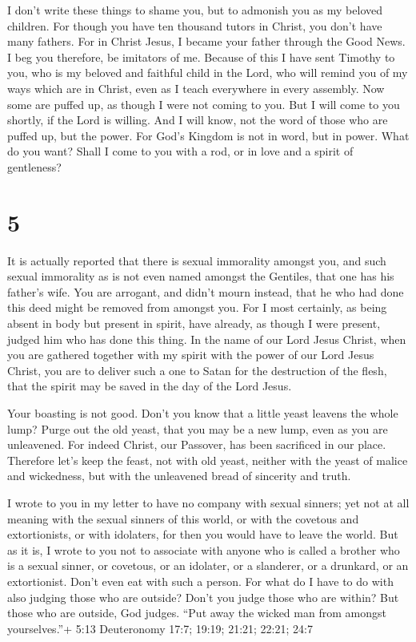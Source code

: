 I don't write these things to shame you, but to admonish
you as my beloved children.  For though you have ten
thousand tutors in Christ, you don't have many fathers. For in Christ
Jesus, I became your father through the Good News.  I beg
you therefore, be imitators of me.  Because of this I have
sent Timothy to you, who is my beloved and faithful child in the Lord,
who will remind you of my ways which are in Christ, even as I teach
everywhere in every assembly.  Now some are puffed up, as
though I were not coming to you.  But I will come to you
shortly, if the Lord is willing. And I will know, not the word of those
who are puffed up, but the power.  For God's Kingdom is not
in word, but in power.  What do you want? Shall I come to
you with a rod, or in love and a spirit of gentleness?

\hypertarget{section-4}{%
\section{5}\label{section-4}}

 It is actually reported that there is sexual immorality
amongst you, and such sexual immorality as is not even named amongst the
Gentiles, that one has his father's wife.  You are arrogant,
and didn't mourn instead, that he who had done this deed might be
removed from amongst you.  For I most certainly, as being
absent in body but present in spirit, have already, as though I were
present, judged him who has done this thing.  In the name of
our Lord Jesus Christ, when you are gathered together with my spirit
with the power of our Lord Jesus Christ,  you are to deliver
such a one to Satan for the destruction of the flesh, that the spirit
may be saved in the day of the Lord Jesus.

 Your boasting is not good. Don't you know that a little
yeast leavens the whole lump?  Purge out the old yeast, that
you may be a new lump, even as you are unleavened. For indeed Christ,
our Passover, has been sacrificed in our place.  Therefore
let's keep the feast, not with old yeast, neither with the yeast of
malice and wickedness, but with the unleavened bread of sincerity and
truth.

 I wrote to you in my letter to have no company with sexual
sinners;  yet not at all meaning with the sexual sinners of
this world, or with the covetous and extortionists, or with idolaters,
for then you would have to leave the world.  But as it is,
I wrote to you not to associate with anyone who is called a brother who
is a sexual sinner, or covetous, or an idolater, or a slanderer, or a
drunkard, or an extortionist. Don't even eat with such a person.
 For what do I have to do with also judging those who are
outside? Don't you judge those who are within?  But those
who are outside, God judges. ``Put away the wicked man from amongst
yourselves.''+ 5:13 Deuteronomy 17:7; 19:19; 21:21; 22:21; 24:7

